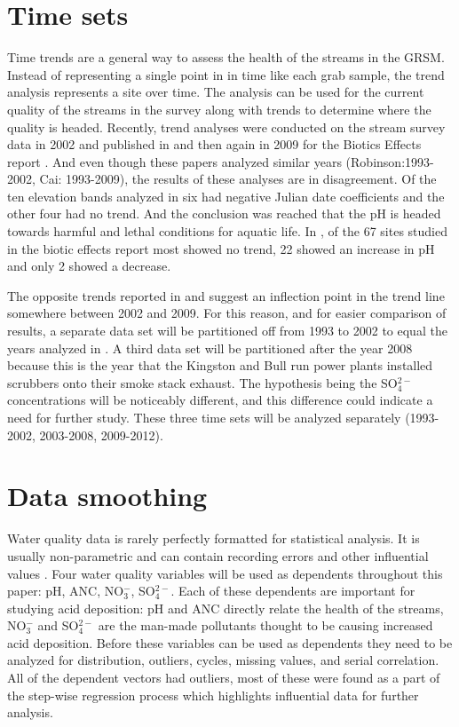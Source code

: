 \section{Time sets}

Time trends are a general way to assess the health of the streams in the GRSM.
Instead of representing a single point in in time like each grab sample, the trend analysis represents a site over time.
The analysis can be used for the current quality of the streams in the survey along with trends to determine where the quality is headed. 
Recently, trend analyses were conducted on the stream survey data in 2002 and published in \citet{robinson2008ph} and then again in 2009 for the Biotics Effects report \citep{cai2013}.
And even though these papers analyzed similar years (Robinson:1993-2002, Cai: 1993-2009), the results of these analyses are in disagreement.
Of the ten elevation bands analyzed in \citet{robinson2008ph} six had negative Julian date coefficients and the other four had no trend.
And the conclusion was reached that the pH is headed towards harmful and lethal conditions for aquatic life. 
In \citet{cai2013}, of the 67 sites studied in the biotic effects report most showed no trend, 22 showed an increase in pH and only 2 showed a decrease. 

The opposite trends reported in  \citet{robinson2008ph} and \citet{cai2013} suggest an inflection point in the trend line somewhere between 2002 and 2009. 
For this reason, and for easier comparison of results,  a separate data set will be partitioned off from 1993 to 2002 to equal the years analyzed in \citet{robinson2008ph}.  
A third data set will be partitioned after the year 2008 because this is the year that the Kingston and Bull run power plants installed scrubbers onto their smoke stack exhaust. 
The hypothesis being the SO$_4^{2-}$ concentrations will be noticeably different, and this difference could indicate a need for further study. 
These three time sets will be analyzed separately (1993-2002, 2003-2008, 2009-2012).

\section{Data smoothing}  \label{sec:smoothing}%

Water quality data is rarely perfectly formatted for statistical analysis.
It is usually  non-parametric and can contain recording errors and other influential values \citep{helsel1992statistical}.
Four water quality variables will be used as dependents throughout this paper: pH, ANC, NO$_3^-$, SO$_4^{2-}$.
Each of these dependents are important for studying acid deposition: pH and ANC directly relate the health of the streams, NO$_3^-$ and SO$_4^{2-}$ are the man-made pollutants thought to be causing increased acid deposition.
Before these variables can be used as dependents they need to be analyzed for distribution, outliers, cycles, missing values, and serial correlation\citep{helsel1992statistical}.
All of the dependent vectors had outliers, most of these were found as a part of the step-wise regression process which highlights influential data for further analysis.

